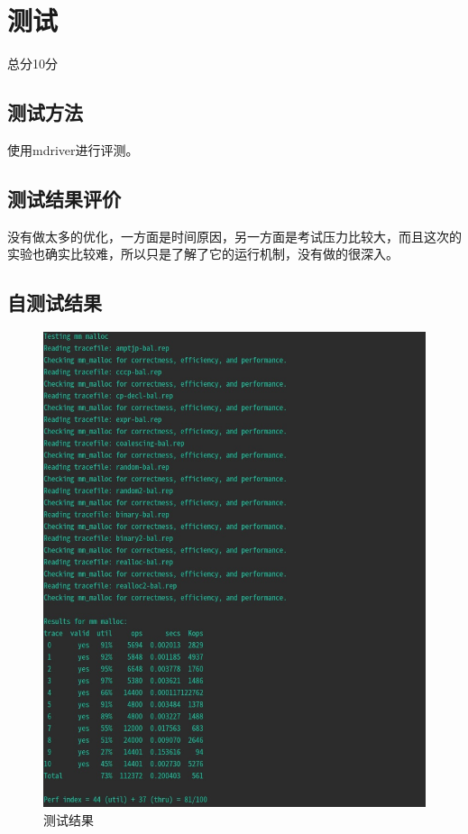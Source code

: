 \section{测试}
\begin{center}
    总分10分
\end{center}

\subsection{测试方法}
使用mdriver进行评测。

\subsection{测试结果评价}
没有做太多的优化，一方面是时间原因，另一方面是考试压力比较大，而且这次的实验也确实比较难，所以只是了解了它的运行机制，没有做的很深入。

\subsection{自测试结果}
\begin{figure}[H]
    \centering
    \includegraphics[width=0.7\linewidth]{figures/Test_Malloc}
    \caption{测试结果}
    \label{fig:testmalloc}
\end{figure}


